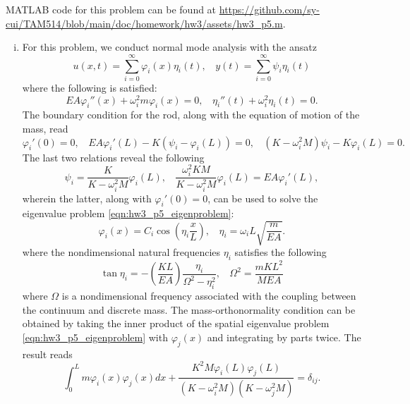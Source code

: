 MATLAB code for this problem can be found at \url{https://github.com/sy-cui/TAM514/blob/main/doc/homework/hw3/assets/hw3_p5.m}.

\begin{enumerate}[(i)]
\item {
    For this problem, we conduct normal mode analysis with the ansatz 
    \begin{equation}
        u(x, t) = \sum_{i=0}^\infty \varphi_i(x) \eta_i(t), ~~~~ y(t) = \sum_{i=0}^\infty \psi_i \eta_i(t)
    \end{equation}
    where the following is satisfied:
    \begin{equation}\label{eqn:hw3_p5_eigenproblem}
        EA \varphi_i''(x) + \omega_i^2 m \varphi_i(x) = 0, ~~~~ \eta_i''(t) + \omega_i^2 \eta_i(t) = 0.
    \end{equation}
    The boundary condition for the rod, along with the equation of motion of the mass, read 
    \begin{equation}\label{eqn:hw3_p5_bc_1}
        \varphi_i'(0) = 0, ~~~~ EA \varphi_i'(L) - K(\psi_i - \varphi_i(L)) = 0, ~~~~ (K - \omega_i^2 M) \psi_i - K\varphi_i(L) = 0.
    \end{equation}
    The last two relations reveal the following
    \begin{equation}\label{eqn:hw3_p5_bc_2}
        \psi_i = \frac{K}{K - \omega_i^2 M} \varphi_i(L), ~~~~ \frac{\omega_i^2 KM}{K - \omega_i^2 M} \varphi_i(L) = EA \varphi_i'(L),
    \end{equation}
    wherein the latter, along with $\varphi_i'(0) = 0$, can be used to solve the eigenvalue problem \cref{eqn:hw3_p5_eigenproblem}:
    \begin{equation}\label{eqn:hw3_p5_eigenfunction}
        \boxed{\varphi_i(x) = C_i \cos\left(\eta_i \frac{x}{L}\right), ~~~~ \eta_i = \omega_i L \sqrt{\frac{m}{EA}}}.
    \end{equation}
    where the nondimensional natural frequencies $\eta_i$ satisfies the following 
    \begin{equation}\label{eqn:hw3_p5_eval_eqn}
        \tan \eta_i = - \left(\frac{KL}{EA}\right) \frac{\eta_i}{\Omega^2 - \eta_i^2}, ~~~~ \Omega^2 = \frac{mKL^2}{MEA}
    \end{equation}
    where $\Omega$ is a nondimensional frequency associated with the coupling between the continuum and discrete mass. 
    The mass-orthonormality condition can be obtained by taking the inner product of the spatial eigenvalue problem \cref{eqn:hw3_p5_eigenproblem} with $\varphi_j(x)$ and integrating by parts twice. 
    The result reads 
    \begin{equation}\label{eqn:hw3_p5_mass_orthonormality}
        \int_0^L m \varphi_i(x) \varphi_j(x) dx + \frac{K^2M \varphi_i(L) \varphi_j(L)}{(K - \omega_i^2 M)(K - \omega_j^2 M)} = \delta_{ij}.
    \end{equation}   
    
}
\end{enumerate}
